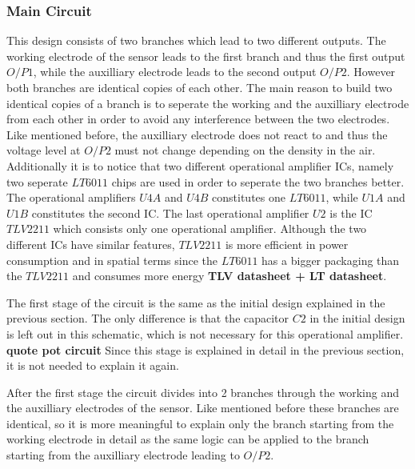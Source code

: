 \subsubsection{Main Circuit}
This design consists of two branches which lead to two different outputs. The working electrode of the sensor leads to the first branch and thus the first output $O/P1$, while the auxilliary electrode leads to the second output $O/P2$. However both branches are identical copies of each other. The main reason to build two identical copies of a branch is to seperate the working and the auxilliary electrode from each other in order to avoid any interference between the two electrodes. Like mentioned before, the auxilliary electrode does not react to  and thus the voltage level at $O/P2$ must not change depending on the  density in the air. Additionally it is to notice that two different operational amplifier ICs, namely two seperate $LT6011$ chips are used in order to seperate the two branches better. The operational amplifiers $U4A$ and $U4B$ constitutes one $LT6011$, while $U1A$ and $U1B$ constitutes the second IC. The last operational amplifier $U2$ is the IC $TLV2211$ which consists only one operational amplifier. Although the two different ICs have similar features, $TLV2211$ is more efficient in power consumption and in spatial terms since the $LT6011$ has a bigger packaging than the $TLV2211$ and consumes more energy \textbf{TLV datasheet + LT datasheet}.\par
The first stage of the circuit is the same as the initial design explained in the previous section. The only difference is that the capacitor $C2$ in the initial design is left out in this schematic, which is not necessary for this operational amplifier. \textbf{quote pot circuit} Since this stage is explained in detail in the previous section, it is not needed to explain it again. \par 
After the first stage the circuit divides into 2 branches through the working and the auxilliary electrodes of the sensor. Like mentioned before these branches are identical, so it is more meaningful to explain only the branch starting from the working electrode in detail as the same logic can be applied to the branch starting from the auxilliary electrode leading to $O/P2$.\par
